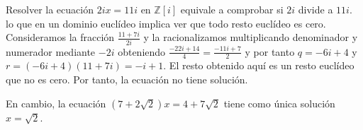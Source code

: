 \begin{example}
	Resolver la ecuación $2ix = 11i$ en $\mathbb{Z}[i]$ equivale a comprobar si $2i$ divide a $11i$. lo que en un dominio euclídeo implica ver que todo resto euclídeo es cero. Consideramos la fracción $\frac{11+7i}{2i}$ y la racionalizamos multiplicando denominador y numerador mediante $-2i$ obteniendo $\frac{-22i+14}{4} = \frac{-11i+7}{2}$ y por tanto $q = -6i+4$ y $r = (-6i+4)(11+7i) = -i+1$. El resto obtenido aquí es un resto euclídeo que no es cero. Por tanto, la ecuación no tiene solución. 
	
	En cambio, la ecuación $(7+2\sqrt{2})x = 4 + 7 \sqrt{2}$ tiene como única solución $x = \sqrt{2}$.
\end{example}

